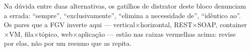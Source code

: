 \begin{comosair}
Na dúvida entre duas alternativas, os gatilhos de distrator deste bloco
denunciam a errada: ``sempre'', ``exclusivamente'', ``elimina a necessidade
de'', ``idêntico ao''. Os pares que a FGV inverte aqui ---
vertical$\times$horizontal, REST$\times$SOAP, container$\times$VM,
fila$\times$tópico, web$\times$aplicação --- estão nas caixas vermelhas acima:
revise por elas, não por um resumo que as repita.
\end{comosair}
